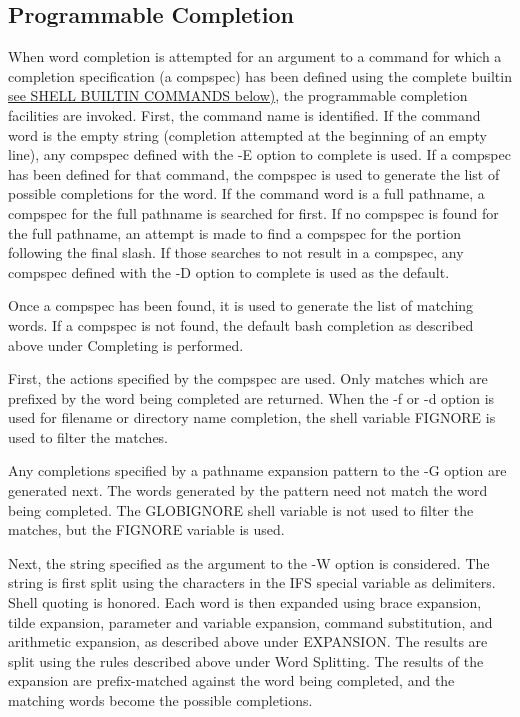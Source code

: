 \subsection{Programmable Completion}\label{sec:programmablecompletion}

When word completion is attempted for an argument to a command for which a completion specification (a compspec) has been defined using the complete builtin \hyperref[sec:shellbuiltincommands]{see SHELL BUILTIN COMMANDS below)}, the programmable completion facilities are invoked.
First, the command name is identified. If the command word is the empty string (completion attempted at the beginning of an empty line), any compspec defined with the -E option to complete is used. If a compspec has been defined for that command, the compspec is used to generate the list of possible completions for the word. If the command word is a full pathname, a compspec for the full pathname is searched for first. If no compspec is found for the full pathname, an attempt is made to find a compspec for the portion following the final slash. If those searches to not result in a compspec, any compspec defined with the -D option to complete is used as the default.

Once a compspec has been found, it is used to generate the list of matching words. If a compspec is not found, the default bash completion as described above under Completing is performed.

First, the actions specified by the compspec are used. Only matches which are prefixed by the word being completed are returned. When the -f or -d option is used for filename or directory name completion, the shell variable FIGNORE is used to filter the matches.

Any completions specified by a pathname expansion pattern to the -G option are generated next. The words generated by the pattern need not match the word being completed. The GLOBIGNORE shell variable is not used to filter the matches, but the FIGNORE variable is used.

Next, the string specified as the argument to the -W option is considered. The string is first split using the characters in the IFS special variable as delimiters. Shell quoting is honored. Each word is then expanded using brace expansion, tilde expansion, parameter and variable expansion, command substitution, and arithmetic expansion, as described above under EXPANSION. The results are split using the rules described above under Word Splitting. The results of the expansion are prefix-matched against the word being completed, and the matching words become the possible completions.

